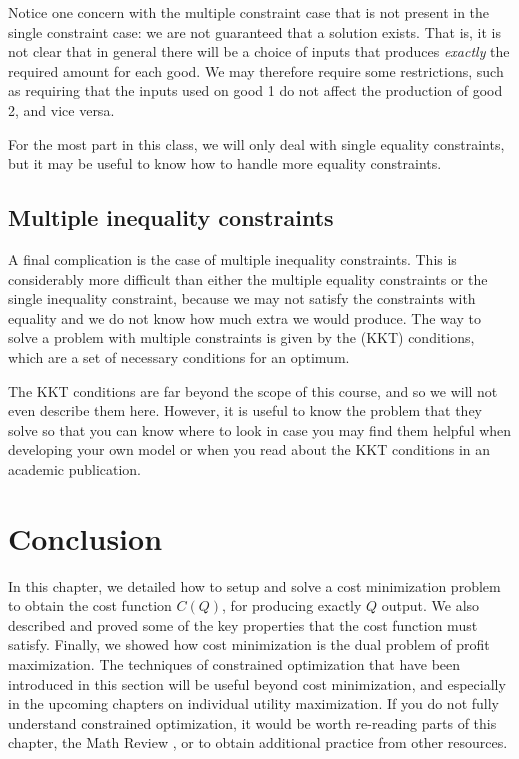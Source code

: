 Notice one concern with the multiple constraint case that is not present in the single constraint case: we are not guaranteed that a solution exists. That is, it is not clear that in general there will be a choice of inputs that produces \emph{exactly} the required amount for each good. We may therefore require some restrictions, such as requiring that the inputs used on good 1 do not affect the production of good 2, and vice versa.

For the most part in this class, we will only deal with single equality constraints, but it may be useful to know how to handle more equality constraints.

\subsection*{Multiple inequality constraints}
A final complication is the case of multiple inequality constraints. This is considerably more difficult than either the multiple equality constraints or the single inequality constraint, because we may not satisfy the constraints with equality and we do not know how much extra we would produce. The way to solve a problem with multiple constraints is given by the  (KKT) conditions, which are a set of necessary conditions for an optimum. 

The KKT conditions are far beyond the scope of this course, and so we will not even describe them here. However, it is useful to know the problem that they solve so that you can know where to look in case you may find them helpful when developing your own model or when you read about the KKT conditions in an academic publication. 

\section*{Conclusion}
In this chapter, we detailed how to setup and solve a cost minimization problem to obtain the cost function $C(Q)$, for producing exactly $Q$ output. We also described and proved some of the key properties that the cost function must satisfy. Finally, we showed how cost minimization is the dual problem of profit maximization. The techniques of constrained optimization that have been introduced in this section will be useful beyond cost minimization, and especially in the upcoming chapters on individual utility maximization. If you do not fully understand constrained optimization, it would be worth re-reading parts of this chapter, the Math Review , or to obtain additional practice from other resources. 